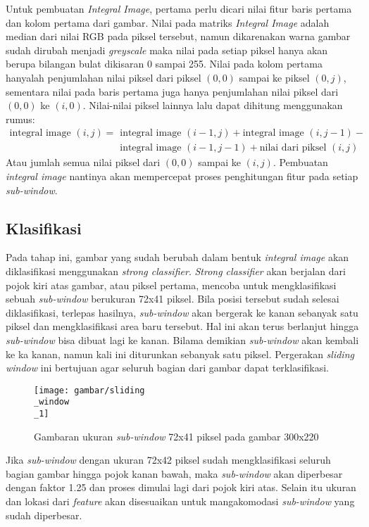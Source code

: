 Untuk pembuatan \emph{Integral Image}, pertama perlu dicari nilai fitur 
baris pertama dan kolom pertama dari gambar. Nilai pada matriks \emph{Integral Image} 
adalah median dari nilai RGB pada piksel tersebut, namun dikarenakan warna 
gambar sudah dirubah menjadi \emph{greyscale} maka nilai pada setiap piksel 
hanya akan berupa bilangan bulat dikisaran 0 sampai 255. Nilai pada kolom 
pertama hanyalah penjumlahan nilai piksel dari piksel $(0, 0)$ sampai ke piksel 
$(0, j)$, sementara nilai pada baris pertama juga hanya penjumlahan nilai 
piksel dari $(0, 0)$ ke  $(i, 0)$. Nilai-nilai piksel lainnya lalu dapat 
dihitung menggunakan rumus: 
\begin{equation}
  \begin{split}
    \text{integral image } (i,j) = {} & \text{integral image } (i-1,j) + \text{integral image } (i,j-1) - \\
    & \text{integral image } (i-1,j-1) + \text{nilai dari piksel } (i,j)
  \end{split}
\end{equation}
Atau jumlah semua nilai piksel dari $(0, 0)$ sampai ke $(i, j)$.
Pembuatan \emph{integral image} nantinya akan mempercepat proses penghitungan 
fitur pada setiap \emph{sub-window}.


\subsection{Klasifikasi}

Pada tahap ini, gambar yang sudah berubah dalam bentuk 
\emph{integral image} akan diklasifikasi menggunakan 
\emph{strong classifier}. \emph{Strong classifier} akan berjalan dari 
pojok kiri atas gambar, atau piksel pertama, mencoba untuk mengklasifikasi 
sebuah \emph{sub-window} berukuran 72x41 piksel. Bila posisi tersebut sudah 
selesai diklasifikasi, terlepas hasilnya, \emph{sub-window} akan 
bergerak ke kanan sebanyak satu piksel dan mengklasifikasi area baru tersebut. 
Hal ini akan terus berlanjut hingga \emph{sub-window} bisa dibuat lagi ke kanan. 
Bilama demikian \emph{sub-window} akan kembali ke ka kanan, namun kali ini 
diturunkan sebanyak satu piksel. Pergerakan \emph{sliding window} ini 
bertujuan agar seluruh bagian dari gambar dapat terklasifikasi.

\begin{figure}[H]
  \centering{}
	\texttt{[image: gambar/sliding\\\_window\\\_1]}
  \caption{Gambaran ukuran \emph{sub-window} 72x41 piksel pada gambar 300x220}
\end{figure}

Jika \emph{sub-window} dengan ukuran 72x42 piksel sudah mengklasifikasi 
seluruh bagian gambar hingga pojok kanan bawah, maka \emph{sub-window} 
akan diperbesar dengan faktor 1.25 dan proses dimulai lagi dari pojok kiri atas. 
Selain itu ukuran dan lokasi dari \emph{feature} akan disesuaikan untuk mangakomodasi 
\emph{sub-window} yang sudah diperbesar. 
